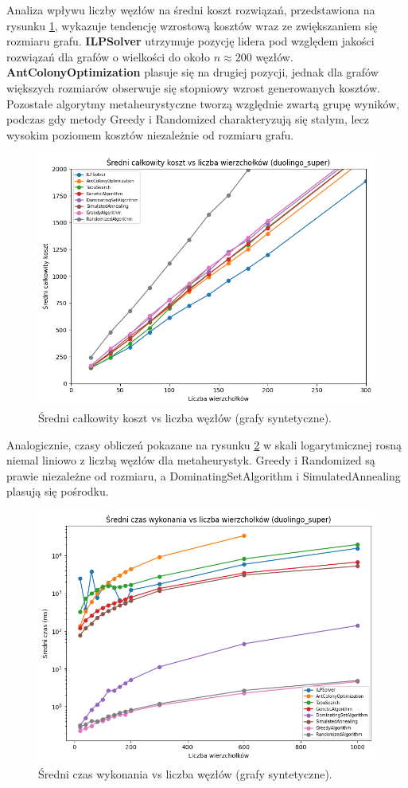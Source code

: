 Analiza wpływu liczby węzłów na średni koszt rozwiązań, przedstawiona na rysunku \ref{fig:synthetic_cost_vs_nodes}, wykazuje tendencję wzrostową kosztów wraz ze zwiększaniem się rozmiaru grafu. \textbf{ILPSolver} utrzymuje pozycję lidera pod względem jakości rozwiązań dla grafów o wielkości do około $n \approx 200$ węzłów. \textbf{AntColonyOptimization} plasuje się na drugiej pozycji, jednak dla grafów większych rozmiarów obserwuje się stopniowy wzrost generowanych kosztów. Pozostałe algorytmy metaheurystyczne tworzą względnie zwartą grupę wyników, podczas gdy metody Greedy i Randomized charakteryzują się stałym, lecz wysokim poziomem kosztów niezależnie od rozmiaru grafu.

\begin{figure}[H]
  \centering
  \includegraphics[width=0.7\linewidth]{assets/figures/synthetic_cost_vs_nodes.png}
  \caption{Średni całkowity koszt vs liczba węzłów (grafy syntetyczne).}
  \label{fig:synthetic_cost_vs_nodes}
\end{figure}

Analogicznie, czasy obliczeń pokazane na rysunku \ref{fig:synthetic_time_vs_nodes} w skali logarytmicznej rosną niemal liniowo z liczbą węzłów dla metaheurystyk. Greedy i Randomized są prawie niezależne od rozmiaru, a DominatingSetAlgorithm i SimulatedAnnealing plasują się pośrodku.

\begin{figure}[H]
  \centering
  \includegraphics[width=0.7\linewidth]{assets/figures/synthetic_time_vs_nodes.png}
  \caption{Średni czas wykonania vs liczba węzłów (grafy syntetyczne).}
  \label{fig:synthetic_time_vs_nodes}
\end{figure}

